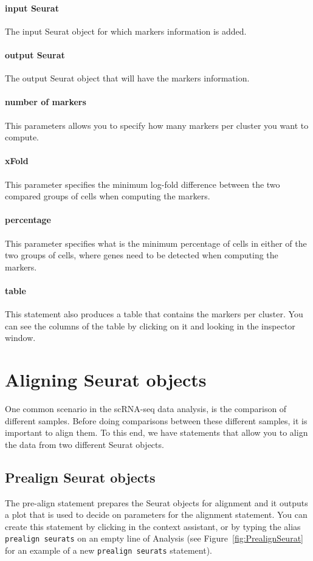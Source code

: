 \paragraph{input Seurat} The input Seurat object for which markers information is added.

\paragraph{output Seurat} The output Seurat object that will have the markers information.

\paragraph{number of markers} This parameters allows you to specify how many markers per cluster
you want to compute.

\paragraph{xFold} This parameter specifies the minimum log-fold difference between
the two compared groups of cells when computing the markers.

\paragraph{percentage} This parameter specifies what is the minimum percentage of cells
in either of the two groups of cells, where genes need to be detected when computing
the markers.

\paragraph{table} This statement also produces a table that contains the markers per cluster.
You can see the columns of the table by clicking on it and looking in the inspector
window.

\section{Aligning Seurat objects}
One common scenario in the scRNA-seq data analysis, is the comparison of different
samples. Before doing comparisons between these different samples, it is important to align them.
To this end, we have statements that allow you to align the data from two different Seurat
objects.

\subsection{Prealign Seurat objects}
The pre-align statement prepares the Seurat objects for alignment and it outputs a plot that
is used to decide on parameters for the alignment statement. You can create this statement by clicking
 in the context assistant, or by typing
the alias \texttt{prealign seurats} on an empty line of Analysis (see Figure~\ref{fig:PrealignSeurat}
for an example of a new \texttt{prealign seurats} statement).

